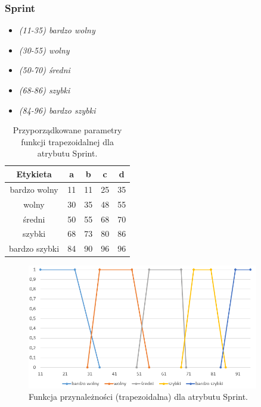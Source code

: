 \documentclass{classrep}
\begin{document}
	\subsubsection{Sprint}
	\begin{itemize}
		\item \textsl{(11-35) bardzo wolny}
		\item \textsl{(30-55) wolny}
		\item \textsl{(50-70) średni}
		\item \textsl{(68-86) szybki}
		\item \textsl{(84-96) bardzo szybki}
	\end{itemize}
	\begin{table}[h!]
		\centering
		\begin{tabular} {c c c c c}
			\hline
			\textbf{Etykieta} & \textbf{a} & \textbf{b} & \textbf{c} & \textbf{d} \\ [0.5ex] 
			\hline	
			\hline 
			bardzo wolny & 11 & 11 & 25 &	35 \\
			wolny & 30 & 35 & 48 & 55  \\
			średni & 50 & 55 & 68 & 70  \\
			szybki & 68 & 73 & 80 & 86  \\
			bardzo szybki & 84 & 90 & 96 & 96  \\	
			\hline
		\end{tabular}
		\caption{Przyporządkowane parametry funkcji trapezoidalnej dla atrybutu Sprint. }
		\label{tabelaSprint}
	\end{table}
	\begin{figure}[h!]
		\centering
		\includegraphics[width=0.9\textwidth]{zmienne/9.png}
		\caption{Funkcja przynależności (trapezoidalna) dla atrybutu Sprint.}
		\label{wykresSprint}
	\end{figure}


	\newpage
\end{document}
